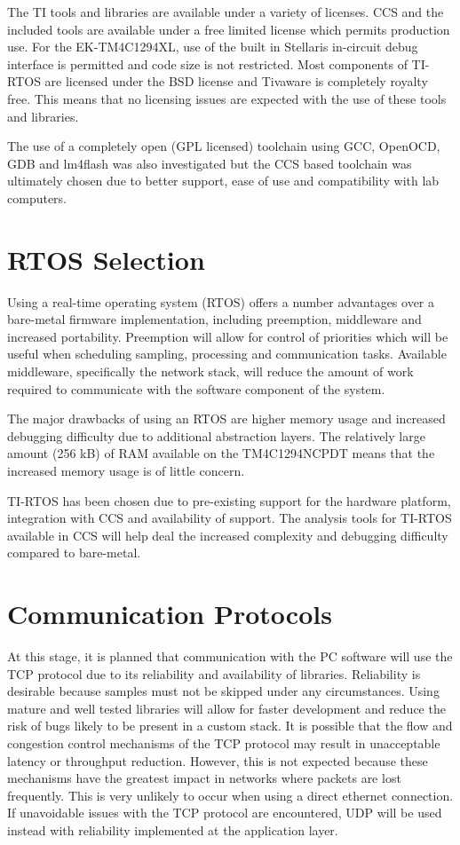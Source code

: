 \documentclass[12pt]{report}
\begin{document}
The TI tools and libraries are available under a variety of licenses. CCS and the included tools are available under a free limited license which permits production use. For the EK-TM4C1294XL, use of the built in Stellaris in-circuit debug interface is permitted and code size is not restricted. Most components of TI-RTOS are licensed under the BSD license and Tivaware is completely royalty free. This means that no licensing issues are expected with the use of these tools and libraries.

The use of a completely open (GPL licensed) toolchain using GCC, OpenOCD, GDB and lm4flash was also investigated but the CCS based toolchain was ultimately chosen due to better support, ease of use and compatibility with lab computers.

\section{RTOS Selection}
Using a real-time operating system (RTOS) offers a number advantages over a bare-metal firmware implementation, including preemption, middleware and increased portability\cite{rtosfactors}. Preemption will allow for control of priorities which will be useful when scheduling sampling, processing and communication tasks. Available middleware, specifically the network stack, will reduce the amount of work required to communicate with the software component of the system.

The major drawbacks of using an RTOS are higher memory usage and increased debugging difficulty due to additional abstraction layers. The relatively large amount (256 kB) of RAM available on the TM4C1294NCPDT means that the increased memory usage is of little concern.

TI-RTOS has been chosen due to pre-existing support for the hardware platform, integration with CCS and availability of support. The analysis tools for TI-RTOS available in CCS will help deal the increased complexity and debugging difficulty compared to bare-metal.

\section{Communication Protocols}
At this stage, it is planned that communication with the PC software will use the TCP protocol due to its reliability and availability of libraries. Reliability is desirable because samples must not be skipped under any circumstances. Using mature and well tested libraries will allow for faster development and reduce the risk of bugs likely to be present in a custom stack. It is possible that the flow and congestion control mechanisms of the TCP protocol may result in unacceptable latency or throughput reduction. However, this is not expected because these mechanisms have the greatest impact in networks where packets are lost frequently\cite{RTOSorBM}. This is very unlikely to occur when using a direct ethernet connection. If unavoidable issues with the TCP protocol are encountered, UDP will be used instead with reliability implemented at the application layer.
\end{document}
